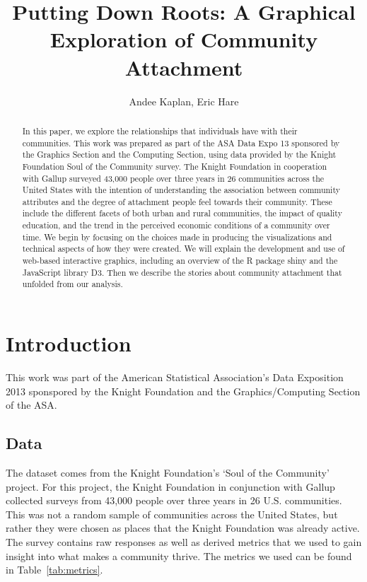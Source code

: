 \documentclass[11pt]{article}\usepackage{knitr}
\begin{document}
\setlength{\parskip}{3ex}
\setlength{\parindent}{0pt}

\title{Putting Down Roots: A Graphical Exploration of Community Attachment}
\author{Andee Kaplan, Eric Hare}

\maketitle

\begin{abstract}
In this paper, we explore the relationships that individuals have with their communities. This work was prepared as part of the ASA Data Expo 13 sponsored by the Graphics Section and the Computing Section, using data provided by the Knight Foundation Soul of the Community survey. The Knight Foundation in cooperation with Gallup surveyed 43,000 people over three years in 26 communities across the United States with the intention of understanding the association between community attributes and the degree of attachment people feel towards their community. These include the different facets of both urban and rural communities, the impact of quality education, and the trend in the perceived economic conditions of a community over time. We begin by focusing on the choices made in producing the visualizations and technical aspects of how they were created. We will explain the development and use of web-based interactive graphics, including an overview of the R package shiny and the JavaScript library D3. Then we describe the stories about community attachment that unfolded from our analysis.
\end{abstract}

\clearpage

\setcounter{page}{1}
\section{Introduction}

This work was part of the American Statistical Association's Data Exposition 2013 sponspored by the Knight Foundation and the Graphics/Computing Section of the ASA.

\subsection{Data}
The dataset comes from the Knight Foundation's `Soul of the Community' project. For this project, the Knight Foundation in conjunction with Gallup collected surveys from 43,000 people over three years in 26 U.S. communities. This was not a random sample of communities across the United States, but rather they were chosen as places that the Knight Foundation was already active. The survey contains raw responses as well as derived metrics that we used to gain insight into what makes a community thrive. The metrics we used can be found in Table~\ref{tab:metrics}.
\end{document}
